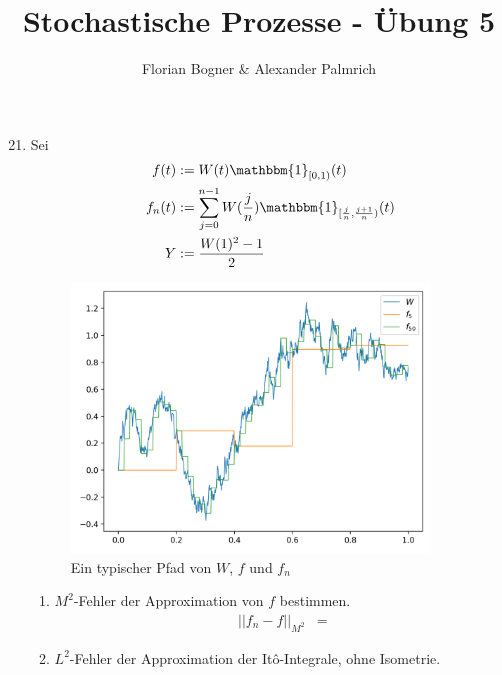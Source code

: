\documentclass[a4paper,11pt,notitlepage,fullpage]{article}
\newcommand{\indd}[1]{\mathbbm{1}_{#1}}
\newcommand{\norm}[2]{\left|\left|{#1}\right|\right|_{#2}}
\begin{document}
\author{Florian Bogner \& Alexander Palmrich}
\title{Stochastische Prozesse - Übung 5}
\maketitle

\begin{enumerate}
\setcounter{enumi}{20}

\item Sei 
\begin{align*}
f(t) &:= W(t) \indd{[0,1)}(t)\\
f_n(t) &:= \sum_{j=0}^{n-1} W(\frac{j}{n}) \indd{[\frac{j}{n}, \frac{j+1}{n})}(t)\\
Y &:= \frac{W(1)^2-1}{2}
\end{align*}

\begin{figure}[h!]
\centering
\includegraphics[width=0.9\textwidth]{gfx/21_fig.png}
\caption{Ein typischer Pfad von $W$, $f$ und $f_n$}
\end{figure}

\begin{enumerate}
\item $M^2$-Fehler der Approximation von $f$ bestimmen.
\begin{align*}
\norm{f_n-f}{M^2} &=
\end{align*}

\item $L^2$-Fehler der Approximation der Itô-Integrale, ohne Isometrie.
\begin{align*}
\end{align*}
\end{enumerate}



\end{enumerate}
\end{document}
